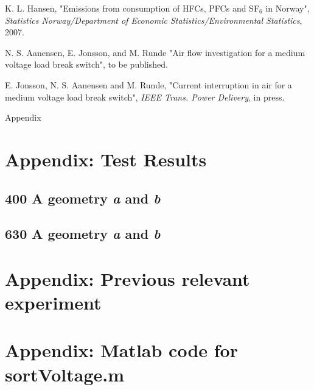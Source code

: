 \documentclass[10pt,b5paper,twoside]{article}
\begin{document}
\begin{thebibliography}{10}
 K. L. Hansen, "Emissions from consumption of HFCs, PFCs and SF$_6$ in Norway", \textit{Statistics Norway/Department of Economic Statistics/Environmental Statistics}, 2007.

 N. S. Aanensen, E. Jonsson, and M. Runde "Air flow investigation for a medium voltage load break switch", to be published.

 E. Jonsson, N. S. Aanensen and M. Runde, "Current interruption in air for a medium voltage load break switch", \textit{IEEE Trans. Power Delivery}, in press.

\end{thebibliography}

\cleardoublepage
\appendix
\vspace*{\fill}
\begingroup
\begin{center}
\huge Appendix
\end{center}
\endgroup
\vspace*{\fill}
\cleardoublepage
\section{Appendix: Test Results} \label{app:rawData}
\setcounter{figure}{0}
\makeatletter 
\renewcommand{\thefigure}{A.\@arabic\c@figure}
\makeatother

\setcounter{table}{0}
\makeatletter 
\renewcommand{\thetable}{A.\@arabic\c@table}
\makeatother

\subsection{400 A geometry \textit{a} and \textit{b}} \label{app:testResults400A} 

\subsection{630 A geometry \textit{a} and \textit{b}} \label{app:testResults630A}

\newpage



\cleardoublepage
\section{Appendix: Previous relevant experiment} \label{app:PrevReleEx}
\makeatletter 
\renewcommand{\thefigure}{B.\@arabic\c@figure}
\makeatother

\makeatletter 
\renewcommand{\thetable}{B.\@arabic\c@table}
\makeatother

\section{Appendix: Matlab code for sortVoltage.m} %

\end{document}
